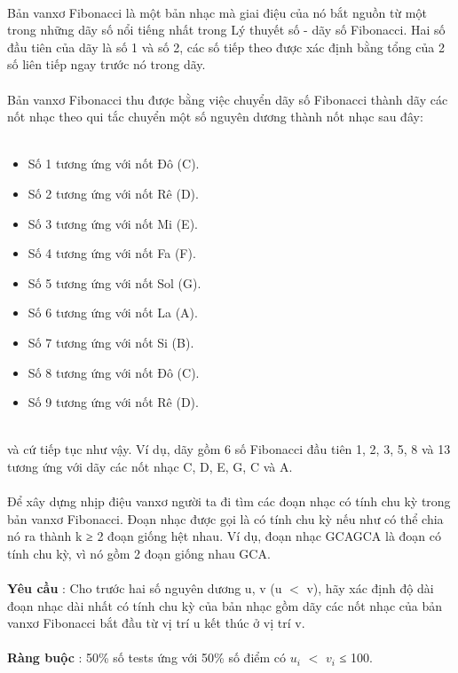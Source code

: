  

Bản vanxơ Fibonacci là một bản nhạc mà giai điệu của nó bắt nguồn từ một trong những dãy số nổi tiếng nhất trong Lý thuyết số - dãy số Fibonacci. Hai số đầu tiên của dãy là số 1 và số 2, các số tiếp theo được xác định bằng tổng của 2 số liên tiếp ngay trước nó trong dãy.
\\
\\Bản vanxơ Fibonacci thu được bằng việc chuyển dãy số Fibonacci thành dãy các nốt nhạc theo qui tắc chuyển một số nguyên dương thành nốt nhạc sau đây:
\\ 
\begin{itemize}
	\item Số 1 tương ứng với nốt Đô (C).
	\item Số 2 tương ứng với nốt Rê (D).
	\item Số 3 tương ứng với nốt Mi (E).
	\item Số 4 tương ứng với nốt Fa (F).
	\item Số 5 tương ứng với nốt Sol (G).
	\item Số 6 tương ứng với nốt La (A).
	\item Số 7 tương ứng với nốt Si (B).
	\item Số 8 tương ứng với nốt Đô (C).
	\item Số 9 tương ứng với nốt Rê (D).
\end{itemize}


\\và cứ tiếp tục như vậy. Ví dụ, dãy gồm 6 số Fibonacci đầu tiên 1, 2, 3, 5, 8 và 13 tương ứng với dãy các nốt nhạc C, D, E, G, C và A.
\\
\\Để xây dựng nhịp điệu vanxơ người ta đi tìm các đoạn nhạc có tính chu kỳ trong bản vanxơ Fibonacci. Đoạn nhạc được gọi là có tính chu kỳ nếu như có thể chia nó ra thành k ≥ 2 đoạn giống hệt nhau. Ví dụ, đoạn nhạc GCAGCA là đoạn có tính chu kỳ, vì nó gồm 2 đoạn giống nhau GCA.
\\
\\\textbf{Yêu cầu } : Cho trước hai số nguyên dương u, v (u $<$ v), hãy xác định độ dài đoạn nhạc dài nhất có tính chu kỳ của bản nhạc gồm dãy các nốt nhạc của bản vanxơ Fibonacci bắt đầu từ vị trí u kết thúc ở vị trí v.
\\
\\\textbf{Ràng buộc } : 50\% số tests ứng với 50\% số điểm có $u_{i}$ $<$ $v_{i}$ ≤ 100.
